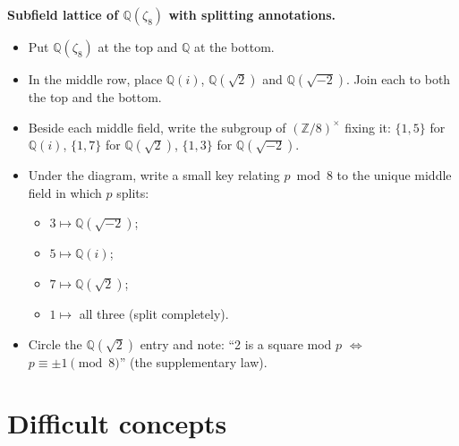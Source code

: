 \documentclass[11pt]{article}
\newcommand{\Z}{\mathbb{Z}}
\newcommand{\Q}{\mathbb{Q}}
\begin{document}
\begin{instructornote}
\textbf{Subfield lattice of $\Q(\zeta_8)$ with splitting annotations.}
\begin{itemize}
  \item Put $\Q(\zeta_8)$ at the top and $\Q$ at the bottom.
  \item In the middle row, place $\Q(i)$, $\Q(\sqrt2)$ and $\Q(\sqrt{-2})$. Join each to both the top and the bottom.
  \item Beside each middle field, write the subgroup of $(\Z/8)^\times$ fixing it: $\{1,5\}$ for $\Q(i)$, $\{1,7\}$ for $\Q(\sqrt2)$, $\{1,3\}$ for $\Q(\sqrt{-2})$.
  \item Under the diagram, write a small key relating $p\bmod 8$ to the unique middle field in which $p$ splits:
  \begin{itemize}
    \item $3\mapsto\Q(\sqrt{-2})$;
    \item $5\mapsto\Q(i)$;
    \item $7\mapsto\Q(\sqrt2)$;
    \item $1\mapsto$ all three (split completely).
  \end{itemize}
  \item Circle the $\Q(\sqrt2)$ entry and note: ``2 is a square mod $p$ $\iff$ $p\equiv\pm1\pmod8$'' (the supplementary law).
\end{itemize}
\end{instructornote}

\section{Difficult concepts}
\end{document}
